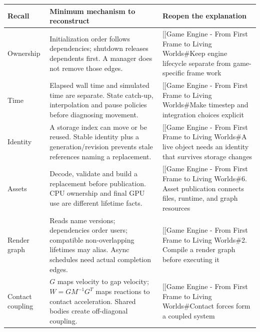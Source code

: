 {\def\LTcaptype{none} %
\begin{longtable}[]{@{}
  >{\raggedright\arraybackslash}p{}
  >{\raggedright\arraybackslash}p{}
  >{\raggedright\arraybackslash}p{}@{}}
\toprule\noalign{}
\begin{minipage}[b]{\linewidth}\raggedright
Recall
\end{minipage} & \begin{minipage}[b]{\linewidth}\raggedright
Minimum mechanism to reconstruct
\end{minipage} & \begin{minipage}[b]{\linewidth}\raggedright
Reopen the explanation
\end{minipage} \\
\midrule\noalign{}
\endhead
\bottomrule\noalign{}
\endlastfoot
Ownership & Initialization order follows dependencies; shutdown releases dependents first. A manager does not remove those edges. & {[}{[}Game Engine - From First Frame to Living Worlds\#Keep engine lifecycle separate from game-specific frame work \\
Time & Elapsed wall time and simulated time are separate. State catch-up, interpolation and pause policies before diagnosing movement. & {[}{[}Game Engine - From First Frame to Living Worlds\#Make timestep and integration choices explicit \\
Identity & A storage index can move or be reused. Stable identity plus a generation/revision prevents stale references naming a replacement. & {[}{[}Game Engine - From First Frame to Living Worlds\#A live object needs an identity that survives storage changes \\
Assets & Decode, validate and build a replacement before publication. CPU ownership and final GPU use are different lifetime facts. & {[}{[}Game Engine - From First Frame to Living Worlds\#6. Asset publication connects files, runtime, and graph resources \\
Render graph & Reads name versions; dependencies order users; compatible non-overlapping lifetimes may alias. Async schedules need actual completion edges. & {[}{[}Game Engine - From First Frame to Living Worlds\#2. Compile a render graph before executing it \\
Contact coupling & \(G\) maps velocity to gap velocity; \(W=GM^{-1}G^T\) maps reactions to contact acceleration. Shared bodies create off-diagonal coupling. & {[}{[}Game Engine - From First Frame to Living Worlds\#Contact forces form a coupled system \\

\end{longtable}}
